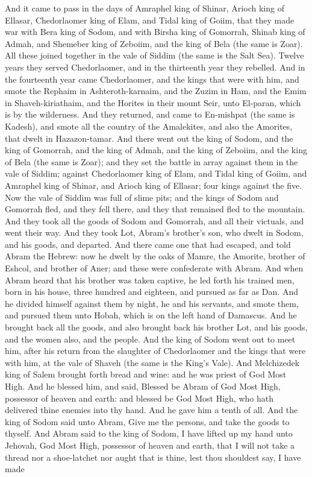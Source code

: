 And it came to pass in the days of Amraphel king of Shinar, Arioch king of Ellasar, Chedorlaomer king of Elam, and Tidal king of Goiim, that they made war with Bera king of Sodom, and with Birsha king of Gomorrah, Shinab king of Admah, and Shemeber king of Zeboiim, and the king of Bela (the same is Zoar). All these joined together in the vale of Siddim (the same is the Salt Sea). Twelve years they served Chedorlaomer, and in the thirteenth year they rebelled. And in the fourteenth year came Chedorlaomer, and the kings that were with him, and smote the Rephaim in Ashteroth-karnaim, and the Zuzim in Ham, and the Emim in Shaveh-kiriathaim, and the Horites in their mount Seir, unto El-paran, which is by the wilderness. And they returned, and came to En-mishpat (the same is Kadesh), and smote all the country of the Amalekites, and also the Amorites, that dwelt in Hazazon-tamar. And there went out the king of Sodom, and the king of Gomorrah, and the king of Admah, and the king of Zeboiim, and the king of Bela (the same is Zoar); and they set the battle in array against them in the vale of Siddim; against Chedorlaomer king of Elam, and Tidal king of Goiim, and Amraphel king of Shinar, and Arioch king of Ellasar; four kings against the five. Now the vale of Siddim was full of slime pits; and the kings of Sodom and Gomorrah fled, and they fell there, and they that remained fled to the mountain. And they took all the goods of Sodom and Gomorrah, and all their victuals, and went their way. And they took Lot, Abram’s brother’s son, who dwelt in Sodom, and his goods, and departed.  And there came one that had escaped, and told Abram the Hebrew: now he dwelt by the oaks of Mamre, the Amorite, brother of Eshcol, and brother of Aner; and these were confederate with Abram. And when Abram heard that his brother was taken captive, he led forth his trained men, born in his house, three hundred and eighteen, and pursued as far as Dan. And he divided himself against them by night, he and his servants, and smote them, and pursued them unto Hobah, which is on the left hand of Damascus. And he brought back all the goods, and also brought back his brother Lot, and his goods, and the women also, and the people.  And the king of Sodom went out to meet him, after his return from the slaughter of Chedorlaomer and the kings that were with him, at the vale of Shaveh (the same is the King’s Vale). And Melchizedek king of Salem brought forth bread and wine: and he was priest of God Most High. And he blessed him, and said, Blessed be Abram of God Most High, possessor of heaven and earth: and blessed be God Most High, who hath delivered thine enemies into thy hand. And he gave him a tenth of all. And the king of Sodom said unto Abram, Give me the persons, and take the goods to thyself. And Abram said to the king of Sodom, I have lifted up my hand unto Jehovah, God Most High, possessor of heaven and earth, that I will not take a thread nor a shoe-latchet nor aught that is thine, lest thou shouldest say, I have made 